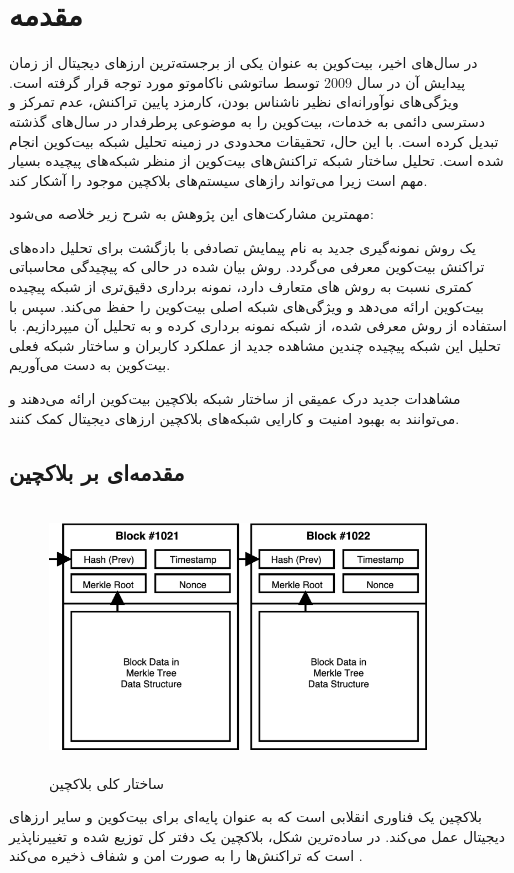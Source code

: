 \chapter{مقدمه}

در سال‌های اخیر، بیت‌کوین \cite{r1} به عنوان یکی از برجسته‌ترین ارزهای دیجیتال از زمان پیدایش آن در سال 2009 توسط ساتوشی ناکاموتو مورد توجه قرار گرفته است. ویژگی‌های نوآورانه‌ای نظیر ناشناس بودن، کارمزد پایین تراکنش، عدم تمرکز و دسترسی دائمی به خدمات، بیت‌کوین را به موضوعی پرطرفدار در سال‌های گذشته تبدیل کرده است. با این حال، تحقیقات محدودی در زمینه تحلیل شبکه بیت‌کوین انجام شده است. تحلیل ساختار شبکه‌ تراکنش‌های بیت‌کوین از منظر شبکه‌های پیچیده بسیار مهم است زیرا می‌تواند رازهای سیستم‌های بلاکچین موجود را آشکار کند.

مهمترین مشارکت‌های این پژوهش به شرح زیر خلاصه می‌شود:

یک روش نمونه‌گیری جدید به نام پیمایش تصادفی با بازگشت برای تحلیل داده‌های تراکنش بیت‌کوین معرفی می‌گردد. روش بیان شده در حالی که پیچیدگی محاسباتی کمتری نسبت به روش های متعارف دارد، نمونه برداری دقیق‌تری از شبکه پیچیده بیت‌کوین ارائه می‌دهد و ویژگی‌های شبکه اصلی بیت‌کوین را حفظ می‌کند.
سپس با استفاده از روش معرفی شده، از شبکه نمونه برداری کرده و به تحلیل آن میپردازیم.
با تحلیل این شبکه پیچیده چندین مشاهده جدید از عملکرد کاربران و ساختار شبکه فعلی بیت‌کوین به دست می‌آوریم.

مشاهدات جدید درک عمیقی از ساختار شبکه بلاکچین بیت‌کوین ارائه می‌دهند و می‌توانند به بهبود امنیت و کارایی شبکه‌های بلاکچین ارزهای دیجیتال کمک کنند.
\section{مقدمه‌ای بر بلاکچین}
 
\begin{figure}[t]
\centering
\includegraphics[height=7cm,width=10cm]{Blockchain.png}
\caption{ساختار کلی بلاکچین}
\label{bc}
\centering
\end{figure}
بلاکچین یک فناوری انقلابی است که به عنوان پایه‌ای برای بیت‌کوین و سایر ارزهای دیجیتال عمل می‌کند. در ساده‌ترین شکل، بلاکچین یک دفتر کل  توزیع شده و تغییرناپذیر است که تراکنش‌ها را به صورت امن و شفاف ذخیره می‌کند \cite{r2}.
